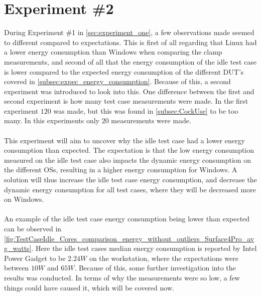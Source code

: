 \section{Experiment \#2}\label{sec:experiment_two}

During Experiment \#1 in \cref{sec:experiment_one}, a few observations made seemed to different compared to expectations. This is first of all regarding that Linux had a lower energy consumption than Windows when comparing the clamp measurements, and second of all that the energy consumption of the idle test case is lower compared to the expected energy consumption of the different DUT's covered in \cref{subsec:expec_energy_consumption}. Because of this, a second experiment was introduced to look into this. One difference between the first and second experiment is how many test case measurements were made. In the first experiment $120$ was made, but this was found in \cref{subsec:CockUse} to be too many. In this experiments only $20$ measurements were made. 

\paragraph*{}
This experiment will aim to uncover why the idle test case had a lower energy consumption than expected. The expectation is that the low energy consumption measured on the idle test case also impacts the dynamic energy consumption on the different OSs, resulting in a higher energy consumption for Windows. A solution will thus increase the idle test case energy consumption, and decrease the dynamic energy consumption for all test cases, where they will be decreased more on Windows. 

\paragraph*{}
An example of the idle test case energy consumption being lower than expected can be observed in \cref{fig:TestCaseIdle_Cores_comparison_energy_without_outliers_Surface4Pro_avg_watts}. Here the idle test cases median energy consumption is reported by Intel Power Gadget to be $2.24W$ on the workstation, where the expectations were between $10W$ and $65W$. Because of this, some further investigation into the results was conducted. In terms of why the measurements were so low, a few things could have caused it, which will be covered now.



